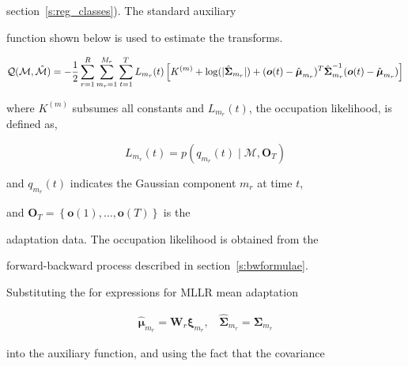 section~\ref{s:reg_classes}).  The standard auxiliary


function shown below is used to estimate the transforms.


\newcommand{\like}{L_{m_r}(t)}


\begin{eqnarray}


{\cal Q}({\cal M},{\hat{\cal M}}) = 


- \frac{1}{2}


\sum_{r=1}^R


\sum_{m_r=1}^{M_r}


\sum_{t=1}^T


\like\left[


K^{(m)}+\log(|{\hat{\bm\Sigma}}_{m_r}|)+({\bm o}(t)-


{\hat{\bm\mu}}_{m_r})^T{{\hat{\bm\Sigma}}}_{m_r}^{-1}({\bm o}(t)-{\hat{\bm\mu}}_{m_r})


\right] \nonumber


\end{eqnarray}


where $K^{(m)}$ subsumes all constants and $\like$, the occupation likelihood, is defined as,


\[ 


         \like = p(q_{m_r}(t)\;|\;\mathcal{M}, \bm{O}_T)


\]


and $q_{m_r}(t)$ indicates the Gaussian component $m_r$ at time $t$,


and $\bm{O}_T = \left\{\bm{o}(1),\dots,\bm{o}(T)\right\}$ is the


adaptation data. The occupation likelihood is obtained from the


forward-backward process described in section~\ref{s:bwformulae}.










Substituting the for expressions for MLLR mean adaptation 


\begin{eqnarray}


\hat{\bm{\mu}}_{m_r} = \bm{W}_r\bm{\xi}_{m_r}, \:\:\:\: 


\hat{\bm{\Sigma}}_{m_r} = {\bm{\Sigma}}_{m_r}


\end{eqnarray}


into the auxiliary function, and using the fact that the covariance


